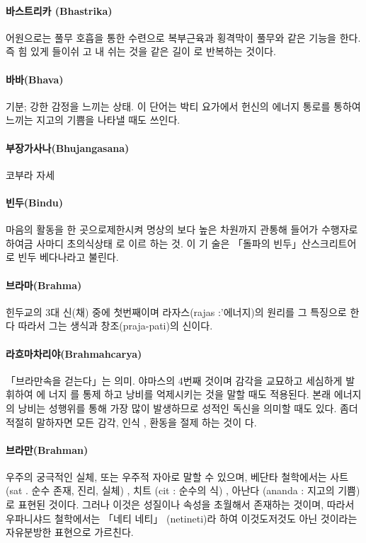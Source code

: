 \documentclass[12pt, a4paper, oneside]{book}
\begin{document}
\paragraph{바스트리카 (Bhastrika)}
어원으로는 풀무 호흡을 통한 수련으로 복부근육과 횡격막이 풀무와 같은 기능을 한다. 즉 힘 있게 들이쉬 고 내 쉬는 것을 같은 길이 로 반복하는 것이다.

\paragraph{바바(Bhava)}
기분; 강한 감정을 느끼는 상태. 이 단어는 박티 요가에서 헌신의 에너지 통로를 통하여 느끼는 지고의  기쁨을 나타낼 때도 쓰인다.



\paragraph{부장가사나(Bhujangasana)}
	코부라 자세

\paragraph{빈두(Bindu)}
마음의 활동을 한 곳으로제한시켜 명상의 보다 높은 차원까지 관통해 들어가 수행자로 하여금 사마디  초의식상태 로 이르 하는 것. 이 기 술은 「돌파의 빈두」산스크리트어로 빈두 베다나라고 불린다.

\paragraph{브라마(Brahma)}
힌두교의 3대 신(채) 중에 첫번째이며 라자스(rajas :'에너지)의 원리를 그 특징으로 한다 따라서 그는 생식과 창조(praja-pati)의 신이다.

\paragraph{라흐마차리야(Brahmahcarya)}
「브라만속을 걷는다」는 의미. 야마스의 4번째 것이며 감각을 교묘하고 세심하게 발휘하여 에 너지 를 통제 하고 낭비를 억제시키는 것을 말할 때도 적용된다. 본래 에너지의 낭비는 성행위를 통해 가장 많이 발생하므로 성적인 독신을 의미할 때도 있다. 좀더 적절히 말하자면 모든 감각, 인식 , 환동을 절제 하는 것이 다.

\paragraph{브라만(Brahman)}
우주의 궁극적인 실체, 또는 우주적 자아로 말할 수 있으며, 베단타 철학에서는 사트(sat . 순수  존재, 진리, 실체) , 치트 (cit : 순수의 식) , 아난다 (ananda :  지고의 기쁨)로 표현된 것이다. 그러나 이것은 성질이나 속성을 초월해서 존재하는 것이며, 따라서 우파니샤드 철학에서는 「네티 네티」 (netineti)라 하여 이것도저것도 아닌 것이라는 자유분방한 표현으로 가르친다.
\end{document}
